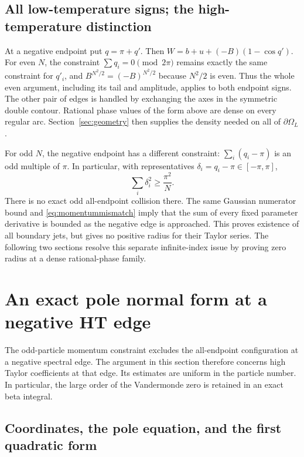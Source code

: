 \documentclass[11pt]{article}
\numberwithin{equation}{section}
\theoremstyle{definition}
\newcommand{\OL}{\Omega_L}
\begin{document}
\subsection{All low-temperature signs; the high-temperature distinction}
At a negative endpoint put $q=\pi+q'$. Then
$W=b+u+(-B)(1-\cos q')$. For even $N$, the constraint
$\sum q_i=0\pmod{2\pi}$ remains exactly the same constraint for
$q'_i$, and $B^{N^2/2}=(-B)^{N^2/2}$ because $N^2/2$ is even.
Thus the whole even argument, including its tail and amplitude, applies
to both endpoint signs. The other pair of edges is handled by exchanging
the axes in the symmetric double contour. Rational phase values of the
form above are dense on every regular arc. Section~\ref{sec:geometry}
then supplies the density needed on all of $\partial\OL$.

For odd $N$, the negative endpoint has a different constraint:
$\sum_i(q_i-\pi)$ is an odd multiple of $\pi$. In particular, with
representatives $\delta_i=q_i-\pi\in[-\pi,\pi]$,
\begin{equation}\label{eq:momentummismatch}
 \sum_i\delta_i^2\ge\frac{\pi^2}{N}.
\end{equation}
There is no exact odd all-endpoint collision there. The same Gaussian
numerator bound and \eqref{eq:momentummismatch} imply that the sum of
every fixed parameter derivative is bounded as the negative edge is
approached. This proves existence of all boundary jets, but gives no
positive radius for their Taylor series. The following two sections
resolve this separate infinite-index issue by proving zero radius at
a dense rational-phase family.



\section{An exact pole normal form at a negative HT edge}
\label{sec:morse}

The odd-particle momentum constraint excludes the all-endpoint
configuration at a negative spectral edge.  The argument in this section
therefore concerns high Taylor coefficients at that edge.  Its estimates
are uniform in the particle number.  In particular, the large order of the
Vandermonde zero is retained in an exact beta integral.

\subsection{Coordinates, the pole equation, and the first quadratic form}
\end{document}
